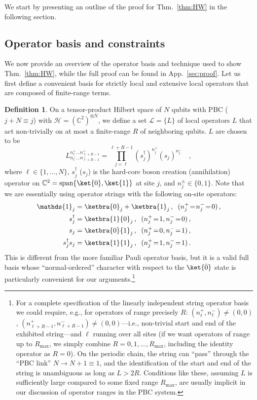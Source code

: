 \documentclass[prx,letterpaper,aps,superscriptaddress,floatfix,twocolumn,nofootinbib]{revtex4-2}
\theoremstyle{definition}
\newtheorem{defin}{Definition}
\begin{document}
%
We start by presenting an outline of the proof for Thm.~\ref{thm:HW} in the following section.
%
\subsection{Operator basis and constraints}
%
We now provide an overview of the operator basis and technique used to show Thm.~\ref{thm:HW}, while the full proof can be found in App.~\ref{sec:proof}. 
%
Let us first define a convenient basis for strictly local and extensive local operators that are composed of finite-range terms. 
%
\begin{defin}
\label{def:opbasis}
%
On a tensor-product Hilbert space of $N$ qubits with PBC ($j+N \equiv j$) with $\mathcal{H}=\left(\mathbb{C}^2\right)^{\otimes N}$, we define a set $\mathcal{L}=\{L\}$ of local operators $L$ that act non-trivially on at most a finite-range $R$ of neighboring qubits.
%
$L$ are chosen to be
\begin{equation}
L^{n^+_{\ell} \dots n^+_{\ell+R-1}}_{n^-_{\ell} \dots n^-_{\ell+R-1}} = \prod_{j=\ell}^{\ell+R-1}(s^\dag_{j})^{n^+_j}(s_{j})^{n^-_j}\quad,
\label{eq:Lbasis}
\end{equation}
where $\ell\in \{1,\dots, N\}$, $s^\dag_j$ ($s_j$) is the hard-core boson creation (annihilation) operator on $\mathbb{C}^2 = \text{span}\{\ket{0}, \ket{1}\}$ at site $j$, and $n_j^\pm \in \{0, 1\}$.
%
Note that we are essentially using operator strings with the following on-site operators:
\begin{align}
    \mathds{1}_j &= \ketbra{0}_j + \ketbra{1}_j \,, \;\;(n_j^+ \!=\! n_j^- \!=\! 0) \,, \label{eq:opbasis1} \\
    s_j^\dagger &= \ketbra{1}{0}_j \,, \;\; (n_j^+ \!=\! 1, n_j^{-} \!=\! 0) \,, \\
    s_j &= \ketbra{0}{1}_j \,,\;\; (n_j^+ \!=\! 0, n_j^- \!=\! 1) \,, \\
    s_j^\dagger s_j &= \ketbra{1}{1}_j \,, \;\; (n_j^+ \!=\! 1, n_j^- \!=\! 1) \,. \label{eq:opbasis4}
\end{align}
%
This is different from the more familiar Pauli operator basis, but it is a valid full basis whose ``normal-ordered'' character with respect to the $\ket{\bar{0}}$ state is particularly convenient for our arguments.\footnote{For a complete specification of the linearly independent string operator basis we could require, e.g., for operators of range precisely $R$: $(n_\ell^+, n_\ell^-) \neq (0,0)$, $(n_{\ell+R-1}^+, n_{\ell+R-1}^-) \neq (0,0)$---i.e., non-trivial start and end of the exhibited string---and $\ell$ running over all sites (if we want operators of range up to $R_{\text{max}}$, we simply combine $R = 0, 1, \dots, R_{\text{max}}$, including the identity operator as $R = 0$).
%
On the periodic chain, the string can ``pass'' through the ``PBC link'' $N \to N+1 \equiv 1$, and the identification of the start and end of the string is unambiguous as long as $L > 2R$.
%
Conditions like these, assuming $L$ is sufficiently large compared to some fixed range $R_{\text{max}}$, are usually implicit in our discussion of operator ranges in the PBC system.}
%


\end{defin}
\end{document}
